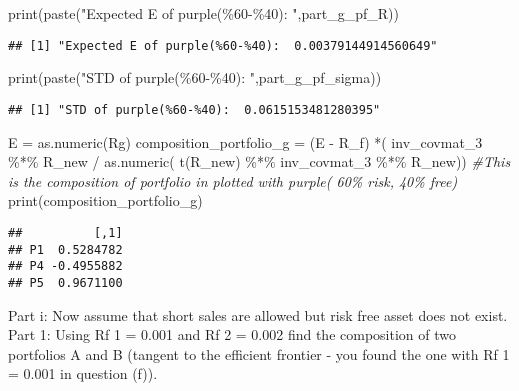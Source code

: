 \documentclass[
]{article}
\newenvironment{Shaded}{\begin{snugshade}}{\end{snugshade}}
\newcommand{\CommentTok}[1]{\textcolor[rgb]{0.56,0.35,0.01}{\textit{#1}}}
\newcommand{\FunctionTok}[1]{\textcolor[rgb]{0.00,0.00,0.00}{#1}}
\newcommand{\NormalTok}[1]{#1}
\newcommand{\OtherTok}[1]{\textcolor[rgb]{0.56,0.35,0.01}{#1}}
\newcommand{\SpecialCharTok}[1]{\textcolor[rgb]{0.00,0.00,0.00}{#1}}
\newcommand{\StringTok}[1]{\textcolor[rgb]{0.31,0.60,0.02}{#1}}
\begin{document}
\begin{Shaded}
\begin{Highlighting}[]
\FunctionTok{print}\NormalTok{(}\FunctionTok{paste}\NormalTok{(}\StringTok{"Expected E of purple(\%60{-}\%40): "}\NormalTok{,part\_g\_pf\_R))}
\end{Highlighting}
\end{Shaded}

\begin{verbatim}
## [1] "Expected E of purple(%60-%40):  0.00379144914560649"
\end{verbatim}

\begin{Shaded}
\begin{Highlighting}[]
\FunctionTok{print}\NormalTok{(}\FunctionTok{paste}\NormalTok{(}\StringTok{"STD of purple(\%60{-}\%40): "}\NormalTok{,part\_g\_pf\_sigma))}
\end{Highlighting}
\end{Shaded}

\begin{verbatim}
## [1] "STD of purple(%60-%40):  0.0615153481280395"
\end{verbatim}

\begin{Shaded}
\begin{Highlighting}[]
\NormalTok{E }\OtherTok{=} \FunctionTok{as.numeric}\NormalTok{(Rg)}
\NormalTok{composition\_portfolio\_g }\OtherTok{=}\NormalTok{ (E }\SpecialCharTok{{-}}\NormalTok{ R\_f) }\SpecialCharTok{*}\NormalTok{( inv\_covmat\_3 }\SpecialCharTok{\%*\%}\NormalTok{ R\_new }\SpecialCharTok{/} \FunctionTok{as.numeric}\NormalTok{( }\FunctionTok{t}\NormalTok{(R\_new) }\SpecialCharTok{\%*\%}\NormalTok{ inv\_covmat\_3 }\SpecialCharTok{\%*\%}\NormalTok{ R\_new))}
\CommentTok{\#This is the composition of portfolio in plotted with purple( 60\% risk, 40\% free)}
\FunctionTok{print}\NormalTok{(composition\_portfolio\_g)}
\end{Highlighting}
\end{Shaded}

\begin{verbatim}
##          [,1]
## P1  0.5284782
## P4 -0.4955882
## P5  0.9671100
\end{verbatim}

Part i: Now assume that short sales are allowed but risk free asset does
not exist. Part 1: Using Rf 1 = 0.001 and Rf 2 = 0.002 find the
composition of two portfolios A and B (tangent to the efficient frontier
- you found the one with Rf 1 = 0.001 in question (f)).
\end{document}
